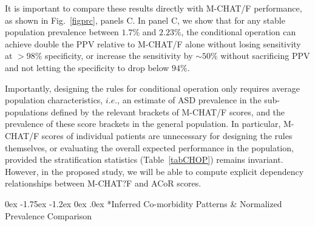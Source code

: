 \documentclass[onecolumn, compsoc,11pt]{IEEEtran}
\makeatletter
\renewcommand\subsection{\@startsection {subsection}{2}{\z@}%
                                   {0ex \@plus -1.75ex \@minus -1.2ex}%
                                   {0ex \@plus.0ex}%
                                   {\fontsize{11}{11}\selectfont\bfseries\sffamily\color{black}}}
\def\ZERO{ACoR\xspace}
\makeatother
\begin{document}
It is important to compare these results directly with M-CHAT/F performance, as shown in Fig.~\ref{figprc}, panels C. In panel C, we show that for any stable population prevalence between 
$1.7\%$ and $2.23\%$, the conditional operation can achieve  double the PPV relative to M-CHAT/F alone without losing sensitivity at $>98\%$ specificity, or increase the sensitivity by $\sim 50\%$ without sacrificing PPV and   not letting the  specificity to drop below $94\%$.
%

Importantly, designing the rules for  conditional  operation  only requires average population characteristics, $i.e.$, an  estimate of ASD prevalence in the sub-populations defined by the  relevant brackets of M-CHAT/F scores, and the prevalence of these score brackets in the general population. In particular,   M-CHAT/F scores of individual patients are unnecessary for designing the rules themselves, or evaluating the overall expected performance in the population, provided the stratification statistics (Table~\ref{tabCHOP}) remains invariant. However, in the proposed study, we will be able to compute explicit dependency relationships between M-CHAT?F and \ZERO scores.
%

\subsection*{Inferred Co-morbidity Patterns \& Normalized Prevalence Comparison}
\end{document}
